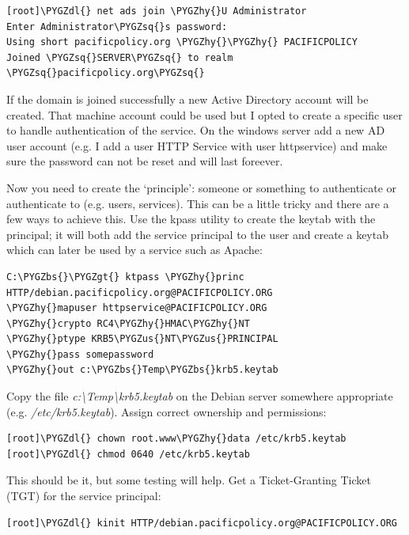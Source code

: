 \documentclass[letterpaper,10pt,english]{sphinxmanual}
\def\PYGZbs{\char`\\}
\def\PYGZus{\char`\_}
\def\PYGZgt{\char`\>}
\def\PYGZdl{\char`\$}
\def\PYGZhy{\char`\-}
\def\PYGZsq{\char`\'}
\renewcommand\PYGZsq{\textquotesingle}
\begin{document}
\begin{Verbatim}[commandchars=\\\{\}]
[root]\PYGZdl{} net ads join \PYGZhy{}U Administrator
Enter Administrator\PYGZsq{}s password:
Using short pacificpolicy.org \PYGZhy{}\PYGZhy{} PACIFICPOLICY
Joined \PYGZsq{}SERVER\PYGZsq{} to realm \PYGZsq{}pacificpolicy.org\PYGZsq{}
\end{Verbatim}

If the domain is joined successfully a new Active Directory account
will be created. That machine account could be used but I opted to
create a specific user to handle authentication of the service. On the
windows server add a new AD user account (e.g. I add a user HTTP
Service with user httpservice) and make sure the password can not be
reset and will last foreever.

Now you need to create the `principle': someone or something to
authenticate or authenticate to (e.g. users, services). This can be a
little tricky and there are a few ways to achieve this. Use the kpass
utility to create the keytab with the principal; it will both add the
service principal to the user and create a keytab which can later be
used by a service such as Apache:

\begin{Verbatim}[commandchars=\\\{\}]
C:\PYGZbs{}\PYGZgt{} ktpass \PYGZhy{}princ HTTP/debian.pacificpolicy.org@PACIFICPOLICY.ORG
\PYGZhy{}mapuser httpservice@PACIFICPOLICY.ORG
\PYGZhy{}crypto RC4\PYGZhy{}HMAC\PYGZhy{}NT
\PYGZhy{}ptype KRB5\PYGZus{}NT\PYGZus{}PRINCIPAL
\PYGZhy{}pass somepassword
\PYGZhy{}out c:\PYGZbs{}Temp\PYGZbs{}krb5.keytab
\end{Verbatim}

Copy the file \emph{c:\textbackslash{}Temp\textbackslash{}krb5.keytab} on the Debian server somewhere
appropriate (e.g. \emph{/etc/krb5.keytab}). Assign correct ownership and
permissions:

\begin{Verbatim}[commandchars=\\\{\}]
[root]\PYGZdl{} chown root.www\PYGZhy{}data /etc/krb5.keytab
[root]\PYGZdl{} chmod 0640 /etc/krb5.keytab
\end{Verbatim}

This should be it, but some testing will help. Get a Ticket-Granting
Ticket (TGT) for the service principal:

\begin{Verbatim}[commandchars=\\\{\}]
[root]\PYGZdl{} kinit HTTP/debian.pacificpolicy.org@PACIFICPOLICY.ORG
\end{Verbatim}
\end{document}
